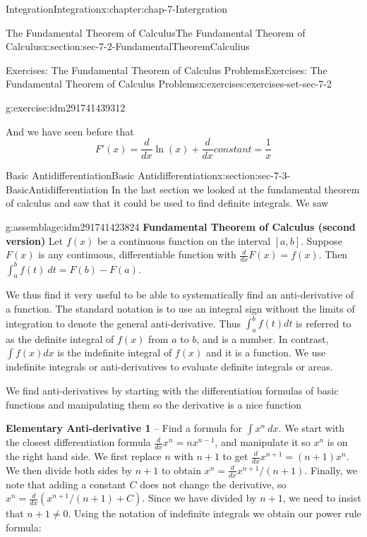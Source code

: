 \documentclass[oneside,10pt,]{book}
\newcommand{\terminology}[1]{\textbf{#1}}
\numberwithin{equation}{section}
\begin{document}
\begin{chapterptx}{Integration}{}{Integration}{}{}{x:chapter:chap-7-Intergration}
\begin{sectionptx}{The Fundamental Theorem of Calculus}{}{The Fundamental Theorem of Calculus}{}{}{x:section:sec-7-2-FundamentalTheoremCalculius}
\begin{exercises-subsection}{Exercises: The Fundamental Theorem of Calculus Problems}{}{Exercises: The Fundamental Theorem of Calculus Problems}{}{}{x:exercises:exercises-set-sec-7-2}
\begin{divisionexercise}{11}{}{}{g:exercise:idm291741439312}
\begin{enumerate}[label=(\alph*)]
\par
And we have seen before that%
%
\begin{equation*}
F'(x)=\frac{d}{dx}  \ln(x)+\frac{d}{dx} constant=\frac{1}{x}
\end{equation*}
\end{enumerate}
\end{divisionexercise}%
\end{exercises-subsection}
\end{sectionptx}
%
%
\typeout{************************************************}
\typeout{************************************************}
%
\begin{sectionptx}{Basic Antidifferentiation}{}{Basic Antidifferentiation}{}{}{x:section:sec-7-3-BasicAntidifferentiation}
In the last section we looked at the fundamental theorem of calculus and saw that it could be used to find definite integrals.  We saw%
\begin{assemblage}{}{g:assemblage:idm291741423824}%
\terminology{Fundamental Theorem of Calculus (second version)} Let \(f(x)\) be a continuous function on the interval \([a, b]\).  Suppose \(F(x)\) is any continuous,  differentiable function with \(\frac{d}{dx} F(x)=f(x)\).  Then \(\int_a^b f(t)\ dt=F(b)-F(a)\).%
\end{assemblage}
We thus find it very useful to be able to systematically find an anti-derivative of a function.  The standard notation is to use an integral sign without the limits of integration to denote the general anti-derivative. Thus \(\int_a^b f(t)dt\) is referred to as the definite integral of \(f(x)\) from \(a\) to \(b\),  and is a number.  In contrast, \(\int f(x) dx\) is the indefinite integral of \(f(x)\) and it is a function.  We use indefinite integrals or anti-derivatives to evaluate definite integrals or areas.%
\par
We find anti-derivatives by starting with the differentiation formulas of basic functions and manipulating them so the derivative is a nice function%
\par
\terminology{Elementary Anti-derivative 1} – Find a formula for \(\int x^n\  dx\). We start with the closest differentiation formula \(\frac{d}{dx} x^n=nx^{n-1}\), and manipulate it so \(x^n\) is on the right hand side.  We first replace \(n\) with \(n+1\) to get \(\frac{d}{dx}  x^{n+1}=(n+1)x^n\).  We then divide both sides by \(n+1\) to obtain \(x^n=\frac{d}{dx}   x^{n+1}/(n+1)\).  Finally, we note that adding a constant \(C\) does not change the derivative, so  \(x^n=\frac{d}{dx}  (x^{n+1}/(n+1)+C)\).  Since we have divided by \(n+1\), we need to insist that \(n+1\ne 0\).  Using the notation of indefinite integrals we obtain our power rule formula:%

\end{sectionptx}
\end{chapterptx}
\end{document}
